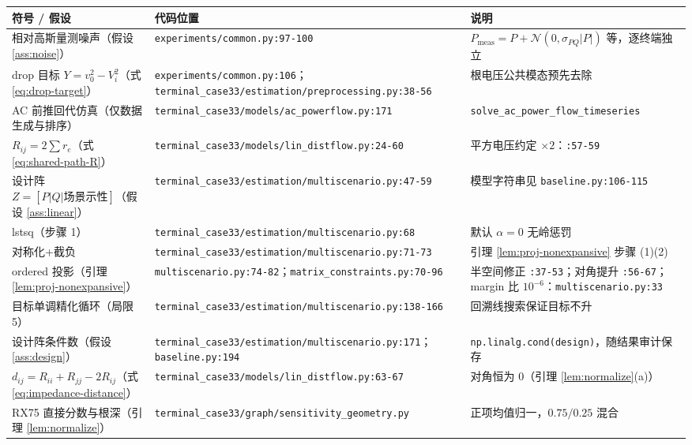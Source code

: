 \documentclass[UTF8,11pt]{ctexart}
\begin{document}
\begin{center}
\footnotesize
\begin{tabular}{p{4.6cm}p{6.2cm}p{4.2cm}}
\toprule
符号 / 假设 & 代码位置 & 说明 \\
\midrule
相对高斯量测噪声（假设 \ref{ass:noise}）
  & \texttt{experiments/common.py:97-100}
  & $P_{\mathrm{meas}}=P+\mathcal N(0,\sigma_{PQ}|P|)$ 等，逐终端独立 \\
drop 目标 $Y=v_0^2-V_i^2$（式 \eqref{eq:drop-target}）
  & \texttt{experiments/common.py:106}；\texttt{terminal\_case33/estimation/preprocessing.py:38-56}
  & 根电压公共模态预先去除 \\
AC 前推回代仿真（仅数据生成与排序）
  & \texttt{terminal\_case33/models/ac\_powerflow.py:171}
  & \texttt{solve\_ac\_power\_flow\_timeseries} \\
$R_{ij}=2\sum r_e$（式 \eqref{eq:shared-path-R}）
  & \texttt{terminal\_case33/models/lin\_distflow.py:24-60}
  & 平方电压约定 $\times2$：\texttt{:57-59} \\
设计阵 $Z=[P|Q|\text{场景示性}]$（假设 \ref{ass:linear}）
  & \texttt{terminal\_case33/estimation/multiscenario.py:47-59}
  & 模型字符串见 \texttt{baseline.py:106-115} \\
lstsq（步骤 1）
  & \texttt{terminal\_case33/estimation/multiscenario.py:68}
  & 默认 $\alpha=0$ 无岭惩罚 \\
对称化+截负
  & \texttt{terminal\_case33/estimation/multiscenario.py:71-73}
  & 引理 \ref{lem:proj-nonexpansive} 步骤 (1)(2) \\
ordered 投影（引理 \ref{lem:proj-nonexpansive}）
  & \texttt{multiscenario.py:74-82}；\texttt{matrix\_constraints.py:70-96}
  & 半空间修正 \texttt{:37-53}；对角提升 \texttt{:56-67}；margin 比 $10^{-6}$：\texttt{multiscenario.py:33} \\
目标单调精化循环（局限 5）
  & \texttt{terminal\_case33/estimation/multiscenario.py:138-166}
  & 回溯线搜索保证目标不升 \\
设计阵条件数（假设 \ref{ass:design}）
  & \texttt{terminal\_case33/estimation/multiscenario.py:171}；\texttt{baseline.py:194}
  & \texttt{np.linalg.cond(design)}，随结果审计保存 \\
$d_{ij}=R_{ii}+R_{jj}-2R_{ij}$（式 \eqref{eq:impedance-distance}）
  & \texttt{terminal\_case33/models/lin\_distflow.py:63-67}
  & 对角恒为 $0$（引理 \ref{lem:normalize}(a)） \\
RX75 直接分数与根深（引理 \ref{lem:normalize}）
  & \texttt{terminal\_case33/graph/sensitivity\_geometry.py}
  & 正项均值归一，$0.75/0.25$ 混合 \\

\end{tabular}
\end{center}
\end{document}
